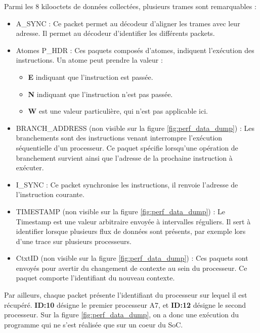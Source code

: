 Parmi les 8 kilooctets de données collectées, plusieurs trames sont
remarquables :

\begin{itemize}[label=\textbullet]
    \item A\_SYNC : Ce packet permet au décodeur d'aligner les trames avec leur
        adresse. Il permet au décodeur d'identifier les différents packets.
    \item Atomes P\_HDR : Ces paquets composés d'atomes, indiquent l'exécution
        des instructions. Un atome peut prendre la valeur :
        \begin{itemize}
            \item \textbf{E} indiquant que l'instruction est passée.
            \item \textbf{N} indiquant que l'instruction n'est pas passée.
            \item \textbf{W} est une valeur particulière, qui n'est pas
                applicable ici.
        \end{itemize}
    \item BRANCH\_ADDRESS (non visible sur la figure \ref{fig:perf_data_dump})
        : Les branchements sont des instructions venant interrompre
        l'exécution séquentielle d'un processeur. Ce paquet spécifie
        lorsqu'une opération de branchement survient ainsi que l'adresse de la
        prochaine instruction à exécuter.
    \item I\_SYNC : Ce packet synchronise les instructions, il renvoie
        l'adresse de l'instruction courante.
    \item TIMESTAMP (non visible sur la figure \ref{fig:perf_data_dump}) : Le
        Timestamp est une valeur arbitraire envoyée à intervalles réguliers.
        Il sert à identifier lorsque plusieurs flux de données sont présents,
        par exemple lors d'une trace sur plusieurs processeurs.
    \item CtxtID (non visible sur la figure \ref{fig:perf_data_dump}) : Ces
        paquets sont envoyés pour avertir du changement de contexte au sein du
        processeur. Ce paquet comporte l'identifiant du nouveau contexte.
\end{itemize}

Par ailleurs, chaque packet présente l'identifiant du processeur sur lequel il
est récupéré. \textbf{ID:10} désigne le premier processeur A7, et
\textbf{ID:12} désigne le second processeur. Sur la figure
\ref{fig:perf_data_dump}, on a donc une exécution du programme qui ne s'est
réalisée que sur un coeur du SoC. \\

